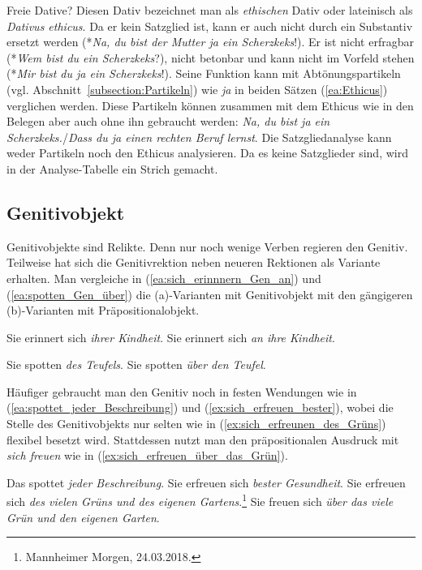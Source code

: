 \begin{Exkurs}{Freie Dative?}
Diesen Dativ bezeichnet man als \textit{ethischen} Dativ oder lateinisch als \textit{Dativus ethicus}. Da er kein Satzglied ist, kann er auch nicht durch ein Substantiv ersetzt werden (*\textit{Na, du bist der Mutter ja ein Scherzkeks}!). Er ist nicht erfragbar (*\textit{Wem bist du ein Scherzkeks}?), nicht betonbar und kann nicht im Vorfeld stehen (*\textit{Mir bist du ja ein Scherzkeks}!). Seine Funktion kann mit Abtönungspartikeln (vgl. Abschnitt~\ref{subsection:Partikeln}) wie \textit{ja} in beiden Sätzen (\ref{ea:Ethicus}) verglichen werden. Diese Partikeln können zusammen mit dem Ethicus wie in den Belegen aber auch ohne ihn gebraucht werden: \textit{Na, du bist ja ein Scherzkeks.}/\textit{Dass du ja einen rechten Beruf lernst}. Die Satzgliedanalyse kann weder Partikeln noch den Ethicus analysieren. Da es keine Satzglieder sind, wird in der Analyse-Tabelle ein Strich gemacht.

\end{Exkurs}

\subsection{Genitivobjekt}\label{subsection:Genitivobjekt}
    
Genitivobjekte sind Relikte. Denn nur noch wenige Verben regieren den Genitiv. Teilweise hat sich die Genitivrektion neben neueren Rektionen als Variante erhalten. Man vergleiche in (\ref{ea:sich_erinnnern_Gen_an}) und (\ref{ea:spotten_Gen_über}) die (a)-Varianten mit Genitivobjekt mit den gängigeren (b)-Varianten mit Präpositionalobjekt.

\largerpage
\ea\label{ea:sich_erinnnern_Gen_an}
\ea \label{ea:sich_erinnern_Gen} Sie erinnert sich \textit{ihrer Kindheit}.
\ex \label{ex:sich_erinnern_an} Sie erinnert sich \textit{an ihre Kindheit}.
\z 
\z 

\ea\label{ea:spotten_Gen_über}
\ea \label{ea:spotten_Gen} Sie spotten \textit{des Teufels}.
\ex \label{ex:spotten_über} Sie spotten \textit{über den Teufel}.
\z 
\z 

Häufiger gebraucht man den Genitiv noch in festen Wendungen wie in (\ref{ea:spottet_jeder_Beschreibung}) und (\ref{ex:sich_erfreuen_bester}), wobei die Stelle des Genitivobjekts nur selten wie in (\ref{ex:sich_erfreunen_des_Grüns}) flexibel besetzt wird. Stattdessen nutzt man den präpositionalen Ausdruck mit \textit{sich freuen} wie in (\ref{ex:sich_erfreuen_über_das_Grün}). 

\ea \label{ea:GenObj_wendung}
\ea \label{ea:spottet_jeder_Beschreibung} Das spottet \textit{jeder Beschreibung}.
\ex \label{ex:sich_erfreuen_bester} Sie erfreuen sich \textit{bester Gesundheit}.
\ex \label{ex:sich_erfreunen_des_Grüns} Sie erfreuen sich \textit{des vielen Grüns und des eigenen Gartens}.\footnote{Mannheimer Morgen, 24.03.2018.} 
\ex \label{ex:sich_erfreuen_über_das_Grün} Sie freuen sich \textit{über das viele Grün und den eigenen Garten}.
\z 
\z 

